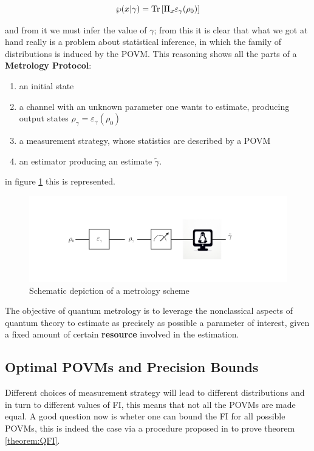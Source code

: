 \begin{equation}
  \wp(x|\gamma) = \mathrm{Tr}\left[\Pi_{x}\varepsilon_{\gamma}(\rho_{0})\right]
\end{equation}

and from it we must infer the value of $\gamma$; from this it is clear that what we got at hand
really is a problem about statistical inference, in which the family of distributions is induced by the POVM.
This reasoning shows all the parts of a \textbf{Metrology Protocol}:

\begin{enumerate}
  \item an initial state
  \item a channel with an unknown parameter one wants to estimate, producing output states $\rho_{\gamma} = \varepsilon_{\gamma}(\rho_{0})$

  \item a measurement strategy, whose statistics are described by a POVM
  \item an estimator producing an estimate $\tilde\gamma$.
\end{enumerate}
in figure \ref{fig:metrology_scheme} this is represented.

\begin{figure}[h]
  \centering
  \includegraphics[scale=0.5]{CodeImages/Esquema_Estimacion.pdf}
  \caption{Schematic depiction of a metrology scheme}
  \label{fig:metrology_scheme}
\end{figure}

The objective of quantum metrology is to leverage the nonclassical
aspects of quantum theory to estimate as precisely as possible a
parameter of interest, given a fixed amount of certain
\textbf{resource} involved in the estimation.

\subsection{Optimal POVMs and Precision Bounds}
Different choices of measurement strategy will lead to different
distributions and in turn to different values of FI, this means
that not all the POVMs are made equal. A good
question now is wheter one can bound the FI for all possible
POVMs, this is indeed the case via a procedure proposed in
\cite{braunstein_statistical_1994} to prove theorem \ref{theorem:QFI}.

